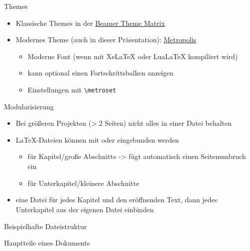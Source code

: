 \documentclass[presentation,aspectratio=169]{beamer}
\begin{document}
\begin{frame}[fragile]{Themes}
  \begin{itemize}
    \item Klassische Themes in der \href{https://hartwork.org/beamer-theme-matrix/}{Beamer Theme Matrix}
    \item Modernes Theme (auch in dieser Präsentation): \href{https://ctan.org/pkg/beamertheme-metropolis}{Metropolis}
      \begin{itemize}
        \item Moderne Font (wenn mit Xe\LaTeX{} oder Lua\LaTeX{} kompiliert wird)
        \item kann optional einen Fortschrittsbalken anzeigen
        \item Einstellungen mit \verb|\metroset|
      \end{itemize}
  \end{itemize}
\end{frame}

\begin{frame}[fragile]{Modularisierung}
  \begin{itemize}
    \item Bei größeren Projekten (> 2 Seiten) nicht alles in einer Datei behalten
    \item \LaTeX{}-Dateien können mit \verb|| oder \verb|| eingebunden werden
      \begin{itemize}
        \item \verb|| für Kapitel/große Abschnitte -> fügt automatisch einen Seitenumbruch ein
        \item \verb|| für Unterkapitel/kleinere Abschnitte
      \end{itemize}
    \item eine Datei für jedes Kapitel und den eröffnenden Text, dann jedes Unterkapitel aus der eigenen Datei einbinden
  \end{itemize}
\end{frame}

\begin{frame}[fragile]{Beispielhafte Dateistruktur}
  
\end{frame}

\begin{frame}[fragile]{Hauptteile eines Dokuments}
  \inputminted{latex}{codebeispiele/parts-of-document.tex}
\end{frame}
\end{document}
